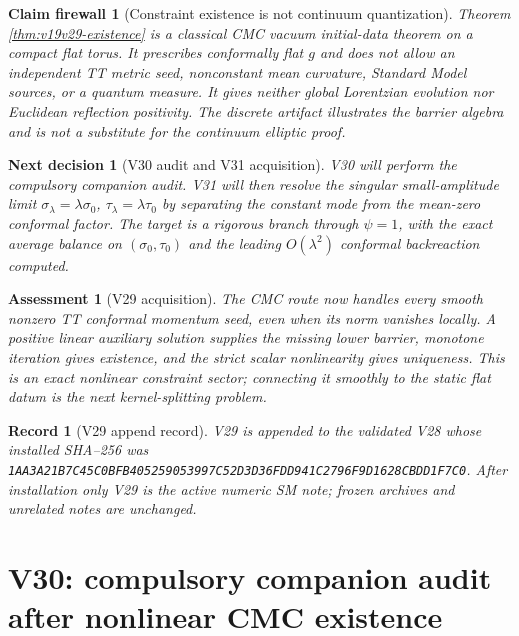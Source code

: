 \documentclass[11pt]{article}
\newtheorem{firewall}[theorem]{Claim firewall}
\newtheorem{decision}[theorem]{Next decision}
\newtheorem{assessment}[theorem]{Assessment}
\newtheorem{record}[theorem]{Record}
\theoremstyle{remark}
\begin{document}
\begin{firewall}[Constraint existence is not continuum quantization]
\label{fire:v19v29}
Theorem \ref{thm:v19v29-existence} is a classical CMC vacuum
initial-data theorem on a compact flat torus.  It prescribes conformally
flat \(g\) and does not allow an independent TT metric seed, nonconstant
mean curvature, Standard Model sources, or a quantum measure.  It gives
neither global Lorentzian evolution nor Euclidean reflection positivity.
The discrete artifact illustrates the barrier algebra and is not a
substitute for the continuum elliptic proof.
\end{firewall}

\begin{decision}[V30 audit and V31 acquisition]
\label{dec:v19v29-next}
V30 will perform the compulsory companion audit.  V31 will then resolve
the singular small-amplitude limit
\(\sigma_\lambda=\lambda\sigma_0\),
\(\tau_\lambda=\lambda\tau_0\) by separating the constant mode from the
mean-zero conformal factor.  The target is a rigorous branch through
\(\psi=1\), with the exact average balance on
\((\sigma_0,\tau_0)\) and the leading \(O(\lambda^2)\) conformal
backreaction computed.
\end{decision}

\begin{assessment}[V29 acquisition]
\label{ass:v19v29}
The CMC route now handles every smooth nonzero TT conformal momentum seed,
even when its norm vanishes locally.  A positive linear auxiliary
solution supplies the missing lower barrier, monotone iteration gives
existence, and the strict scalar nonlinearity gives uniqueness.  This is
an exact nonlinear constraint sector; connecting it smoothly to the
static flat datum is the next kernel-splitting problem.
\end{assessment}

\begin{record}[V29 append record]
\label{rec:v19v29}
V29 is appended to the validated V28 whose installed SHA--256 was
\texttt{1AA3A21B7C45C0BFB405259053997C52D3D36FDD941C2796F9D1628CBDD1F7C0}.
After installation only V29 is the active numeric SM note; frozen
archives and unrelated notes are unchanged.
\end{record}



\section{V30: compulsory companion audit after nonlinear CMC existence}
\label{sec:v19v30}
\end{document}
